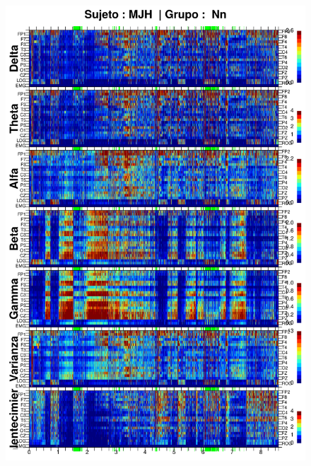 \begin{figure}
\centering
\includegraphics[width=0.9\linewidth]
{./enlentecimiento/MJNNVIGILOS_espectral_total.png} 
\end{figure}

